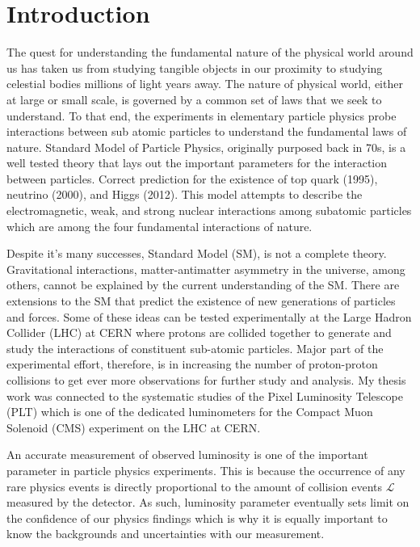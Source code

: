 \chapter{Introduction} \label{ch:Introduction}

The quest for understanding the fundamental nature of the physical world around us has taken us from studying tangible objects in our proximity to studying celestial bodies millions of light years away. The nature of physical world, either at large or small scale, is governed by a common set of laws that we seek to understand. To that end, the experiments in elementary particle physics probe interactions between sub atomic particles to understand the fundamental laws of nature. Standard Model of Particle Physics, originally purposed back in 70s, is a well tested theory that lays out the important parameters for the interaction between particles. Correct prediction for the existence of top quark (1995), neutrino (2000), and Higgs (2012). This model attempts to describe the electromagnetic, weak, and strong nuclear interactions among subatomic particles which are among the four fundamental interactions of nature.

Despite it's many successes, Standard Model (SM), is not a complete theory. Gravitational interactions, matter-antimatter asymmetry in the universe, among others, cannot be explained by the current understanding of the SM. There are extensions to the SM that predict the existence of new generations of particles and forces. Some of these ideas can be tested experimentally at the Large Hadron Collider (LHC) at CERN where protons are collided together to generate and study the interactions of constituent sub-atomic particles. Major part of the experimental effort, therefore, is in increasing the number of proton-proton collisions to get ever more observations for further study and analysis. My thesis work was connected to the systematic studies of the Pixel Luminosity Telescope (PLT) which is one of the dedicated luminometers for the Compact Muon Solenoid (CMS) experiment on the LHC at CERN.

 
An accurate measurement of observed luminosity is one of the important parameter in particle physics experiments. This is because the occurrence of any rare physics events is directly proportional to the amount of collision events $\mathcal{L}$ measured by the detector. As such, luminosity parameter eventually sets limit on the confidence of our physics findings which is why it is equally important to know the backgrounds and uncertainties with our measurement. 

